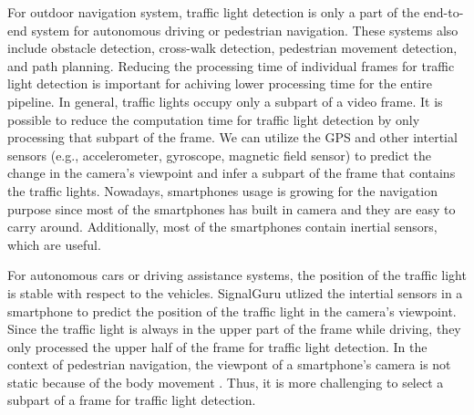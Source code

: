 
For outdoor navigation system, traffic light detection is only a part of the end-to-end system for autonomous driving or pedestrian navigation.
These systems also include obstacle detection, cross-walk detection, pedestrian movement detection, and path planning.
Reducing the processing time of individual frames for traffic light detection is important for achiving lower processing time for the entire pipeline.
In general, traffic lights occupy only a subpart of a video frame.
It is possible to reduce the computation time for traffic light detection by only processing that subpart of the frame.
We can utilize the GPS and other intertial sensors (e.g., accelerometer, gyroscope, magnetic field sensor) \cite{sensor,sensor2,sensor3} to predict the change in the camera's viewpoint and infer a subpart of the frame that contains the traffic lights. 
Nowadays, smartphones usage is growing for the navigation purpose since most of the smartphones has built in camera and they are easy to carry around.
Additionally, most of the smartphones contain inertial sensors, which are useful.

For autonomous cars or driving assistance systems, the position of the traffic light is stable with respect to the vehicles.
SignalGuru \cite{signalguru} utlized the intertial sensors in a smartphone to predict the position of the traffic light in the camera's viewpoint.
Since the traffic light is always in the upper part of the frame while driving, they only processed the upper half of the frame for traffic light detection.
In the context of pedestrian navigation, the viewpont of a smartphone's camera is not static because of the body movement \cite{sensor_pedestrian,sensor_pedestrian2}.
Thus, it is more challenging to select a subpart of a frame for traffic light detection.







